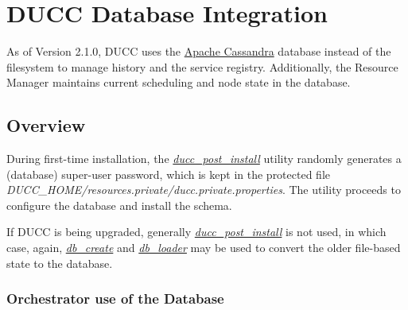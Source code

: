% 
% 
% 
% 
\section{DUCC Database Integration}
\label{sec:ducc.database}

    As of Version 2.1.0, DUCC uses the \href{https://cassandra.apache.org/}{Apache Cassandra}
    database instead of the filesystem to manage
    history and the service registry.  Additionally, the Resource Manager maintains
    current scheduling and node state in the database.

   \subsection{Overview}

    During first-time installation, the \hyperref[subsec:install.single-user]{\em ducc\_post\_install} utility
    randomly generates a (database) super-user password, which is kept in the protected file {\em DUCC\_HOME/resources.private/ducc.private.properties}.
    The utility proceeds to configure the database and install the schema.

    If DUCC is being upgraded, generally \hyperref[subsec:install.single-user]{\em ducc\_post\_install} is not used, in 
    which case, again, \hyperref[subsec:cli.db.create]{\em db\_create} and \hyperref[subsec:cli.db.loader]{\em db\_loader} may be used to
    convert the older file-based state to the database.

    \subsubsection{Orchestrator use of the Database}

